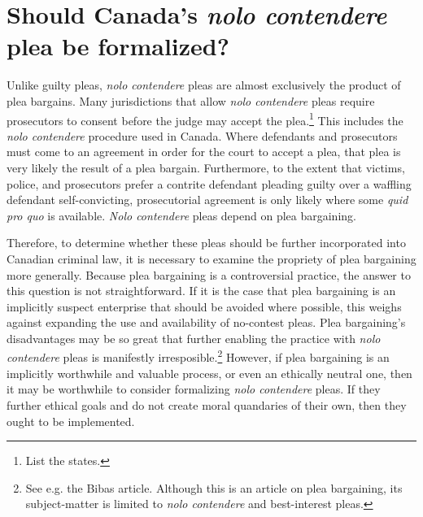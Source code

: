 \chapter{Should Canada's \textit{nolo contendere} plea be formalized?}

Unlike guilty pleas, \textit{nolo contendere} pleas are almost exclusively the product of plea bargains. Many jurisdictions that allow \textit{nolo contendere} pleas require prosecutors to consent before the judge may accept the plea.\footnote{List the states.} This includes the \textit{nolo contendere} procedure used in Canada. Where defendants and prosecutors must come to an agreement in order for the court to accept a plea, that plea is very likely the result of a plea bargain. Furthermore, to the extent that victims, police, and prosecutors prefer a contrite defendant pleading guilty over a waffling defendant self-convicting, prosecutorial agreement is only likely where some \textit{quid pro quo} is available. \textit{Nolo contendere} pleas depend on plea bargaining.

Therefore, to determine whether these pleas should be further incorporated into Canadian criminal law, it is necessary to examine the propriety of plea bargaining more generally. Because plea bargaining is a controversial practice, the answer to this question is not straightforward. If it is the case that plea bargaining is an implicitly suspect enterprise that should be avoided where possible, this weighs against expanding the use and availability of no-contest pleas. Plea bargaining's disadvantages may be so great that further enabling the practice with \textit{nolo contendere} pleas is manifestly irresposible.\footnote{See e.g. the Bibas article. Although this is an article on plea bargaining, its subject-matter is limited to \textit{nolo contendere} and best-interest pleas.} However, if plea bargaining is an implicitly worthwhile and valuable process, or even an ethically neutral one, then it may be worthwhile to consider formalizing \textit{nolo contendere} pleas. If they further ethical goals and do not create moral quandaries of their own, then they ought to be implemented.

